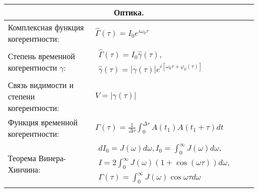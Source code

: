 \documentclass{article}
\begin{document}
\begin{tabular}{ |p{4.2cm}|p{5.3cm}|p{6cm}|p{3.5cm}|  }
\hline
\multicolumn{4}{|c|}{Оптика.} \\
\hline
Комплексная функция когерентности:                                           &  %
$\hat{\Gamma}(\tau) = I_0 e^{i \omega_0 \tau}$                               &  %
                                                                             &  %
                                                                             \\ %
\hline
Степень временной когерентности $\gamma$:                                    &  %
$\begin{aligned}
\hat{\Gamma}(\tau) = I_0 \hat{\gamma}(\tau),  \\
\hat{\gamma}(\tau) = | \gamma (\tau) | e^{i[\omega_0 \tau + \varphi_0(\tau)]}
\end{aligned}$                                                               &  %
                                                                             &  %
                                                                             \\ %
\hline
Связь видимости и степени когерентности:                                     &  %
$V = |\gamma(\tau)|$                                                         &  %
                                                                             &  %
                                                                             \\ %
\hline
Функция временной когерентности:                                             &  %
$\Gamma(\tau) = \frac{1}{\Delta \tau}
 \int_0^{\Delta \tau} A(t_1) A(t_1 + \tau) dt$                               &  %
                                                                             &  %
                                                                             \\ %
\hline
Теорема Винера-Хинчина:                                                      &  %
$\begin{aligned}
dI_0 = J(\omega) d\omega, I_0 = \int_0^\infty J(\omega) d\omega, \\
I = 2 \int_0^\infty J(\omega)(1 + \cos(\omega \tau)) d\omega,    \\
\Gamma(\tau) = \int_0^{\infty} J(\omega) \cos{\omega \tau} d \omega
\end{aligned}$                                                               &  %

\end{tabular}
\end{document}
